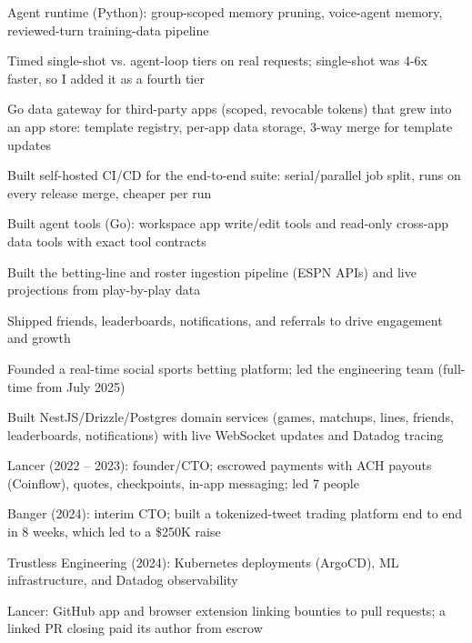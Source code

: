 \documentclass[print]{jack-resume}
\begin{document}
\begin{tightemize}
    \item Agent runtime (Python): group-scoped memory pruning, voice-agent memory, reviewed-turn training-data pipeline
    \item Timed single-shot vs. agent-loop tiers on real requests; single-shot was 4-6x faster, so I added it as a fourth tier
    \item Go data gateway for third-party apps (scoped, revocable tokens) that grew into an app store: template registry, per-app data storage, 3-way merge for template updates
    \item Built self-hosted CI/CD for the end-to-end suite: serial/parallel job split, runs on every release merge, cheaper per run
    \item Built agent tools (Go): workspace app write/edit tools and read-only cross-app data tools with exact tool contracts
\end{tightemize}
\sectionsep

\begin{tightemize}
    \item Built the betting-line and roster ingestion pipeline (ESPN APIs) and live projections from play-by-play data
    \item Shipped friends, leaderboards, notifications, and referrals to drive engagement and growth
    \item Founded a real-time social sports betting platform; led the engineering team (full-time from July 2025)
    \item Built NestJS/Drizzle/Postgres domain services (games, matchups, lines, friends, leaderboards, notifications) with live WebSocket updates and Datadog tracing
\end{tightemize}
\sectionsep

\begin{tightemize}
    \item Lancer (2022 -- 2023): founder/CTO; escrowed payments with ACH payouts (Coinflow), quotes, checkpoints, in-app messaging; led 7 people
    \item Banger (2024): interim CTO; built a tokenized-tweet trading platform end to end in 8 weeks, which led to a \$250K raise
    \item Trustless Engineering (2024): Kubernetes deployments (ArgoCD), ML infrastructure, and Datadog observability
    \item Lancer: GitHub app and browser extension linking bounties to pull requests; a linked PR closing paid its author from escrow
\end{tightemize}
\sectionsep
\end{document}
